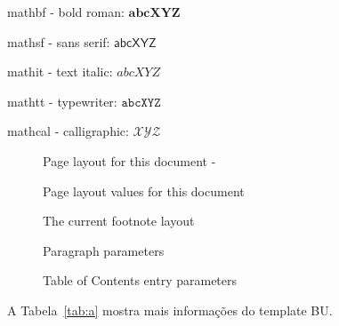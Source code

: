 mathbf - bold roman: $\mathbf{abcXYZ}$

mathsf - sans serif: $\mathsf{abcXYZ}$

mathit - text italic: $\mathit{abcXYZ}$

mathtt -  typewriter: $\mathtt{abcXYZ}$

mathcal - calligraphic: $\mathcal{XYZ}$



\begin{figure}
	\caption{Page layout for this document -  \showfont} \label{fig:ptrs}
	\drawparameterstrue
	\drawpage
\end{figure}




\begin{figure}
	\caption{Page layout values for this document} \label{fig:ptrsval}

	\pagevalues
\end{figure}



\begin{figure}
	\currentfootnote
	\drawparameterstrue
	\drawfootnote
	\footnotevalues
	\caption{The current footnote layout}\label{fig:ftry}
\end{figure}	
	

\begin{figure}
	\drawparagraph
	\paragraphvalues
	\caption{Paragraph parameters}\label{fig:fpara}
\end{figure}


\begin{figure}
    \drawparameterstrue
	\drawtoc
	\tocvalues
	\caption{Table of Contents entry parameters}\label{fig:tocp}
\end{figure}





A Tabela~\ref{tab:a} mostra mais informações do template BU.

